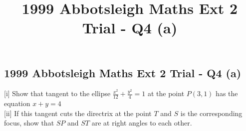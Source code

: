 \documentclass[10pt,a4paper]{report}
\title{1999 Abbotsleigh Maths Ext 2 Trial - Q4 (a)}
\theoremstyle{thm}
\begin{document}
\subsection*{1999 Abbotsleigh Maths Ext 2 Trial - Q4 (a)}
[i] Show that tangent to the ellipse $\displaystyle\frac{x^2}{12} + 
\frac{y^2}{4} = 1$ at the point $P\left(3,1\right)$ has the equation $x 
+ y = 4$\\[1em]
[ii] If this tangent cuts the directrix at the point $T$ and $S$ is the 
corresponding focus, show that $SP$ and $ST$ are at right angles to each 
other.\\
\end{document}
